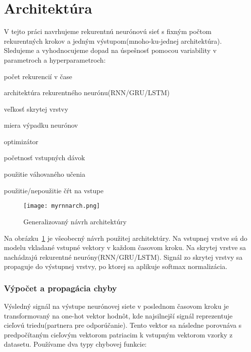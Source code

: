 \section{Architektúra}

V tejto práci navrhujeme rekurentnú neurónovú sieť s fixným počtom rekurentných krokov a jedným výstupom(mnoho-ku-jednej architektúra). Sledujeme a vyhodnocujeme dopad na úspešnosť pomocou variability v parametroch a hyperparametroch:

\begin{my_itemize}
	\item počet rekurencií v čase
	\item architektúra rekurentného neurónu(RNN/GRU/LSTM)
	\item veľkosť skrytej vrstvy
	\item miera výpadku neurónov
	\item optimizátor
	\item početnosť vstupných dávok
	\item použitie váhovaného učenia
	\item použitie/nepoužitie čŕt na vstupe
\end{my_itemize}

\begin{figure}[H]
\begin{center}
\texttt{[image: myrnnarch.png]}\end{center}
\caption[myrnnarch]{Generalizovaný návrh architektúry}
\label{fig:myrnnarch}
\end{figure} 

Na obrázku~\ref{fig:myrnnarch} je všeobecný návrh použitej architektúry. Na vstupnej vrstve sú do modelu vkladané vstupné vektory v každom časovom kroku. Na skrytej vrstve sa nachádzajú rekurentné neuróny(RNN/GRU/LSTM). Signál zo skrytej vrstvy sa propaguje do výstupnej vrstvy, po ktorej sa aplikuje softmax normalizácia.

\subsubsection*{Výpočet a propagácia chyby}
Výsledný signál na výstupe neurónovej siete v poslednom časovom kroku je transformovaný na one-hot vektor hodnôt, kde najsilnejší signál reprezentuje cieľovú triedu(partnera pre odporúčanie). Tento vektor sa následne porovnáva s predpočítaným cieľovým vektorom patriacim k vstupným vektorom vzorky z datasetu.\newline
Používame dva typy chybovej funkcie:\newline

